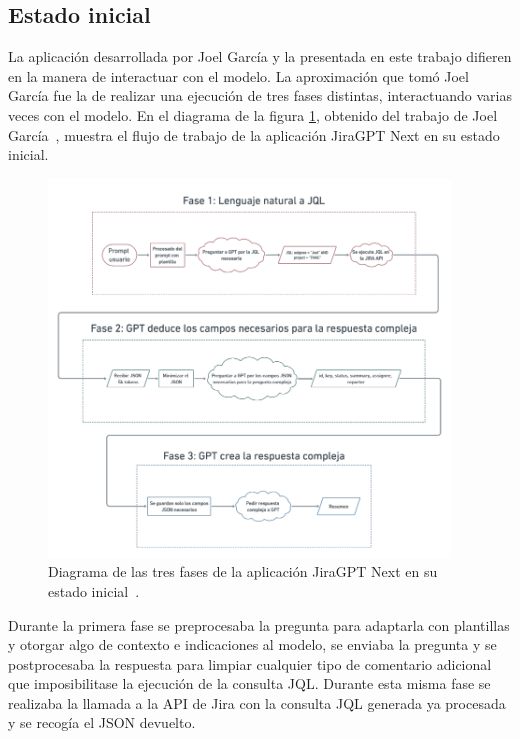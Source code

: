 \subsection{Estado inicial}
La aplicación desarrollada por Joel García y la presentada en este trabajo difieren en la manera de interactuar con el modelo. La aproximación que tomó Joel García fue la de realizar una ejecución de tres fases distintas, interactuando varias veces con el modelo. En el diagrama de la figura \ref{fig:diagrama_joel}, obtenido del trabajo de Joel García~\cite{jiragpt}, muestra el flujo de trabajo de la aplicación JiraGPT Next en su estado inicial.

\begin{figure}[H]
    \centering
    \includegraphics[width=0.95\textwidth]{images/diagrama_joel.png}
    \caption{Diagrama de las tres fases de la aplicación JiraGPT Next en su estado inicial~\cite{jiragpt}.}\label{fig:diagrama_joel}
\end{figure}

Durante la primera fase se preprocesaba la pregunta para adaptarla con plantillas y otorgar algo de contexto e indicaciones al modelo, se enviaba la pregunta y se postprocesaba la respuesta para limpiar cualquier tipo de comentario adicional que imposibilitase la ejecución de la consulta JQL. Durante esta misma fase se realizaba la llamada a la API de Jira con la consulta JQL generada ya procesada y se recogía el JSON devuelto.

